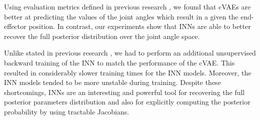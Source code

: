 \documentclass[conference]{IEEEtran}
\begin{document}
Using evaluation metrics defined in previous research \cite{Kruse2019}, we found that cVAEs are better at predicting the values of the joint angles which result in a given the end-effector position. In contrast, our experiments show that INNs are able to better recover the full posterior distribution over the joint angle space. 

Unlike stated in previous research \cite{Ardizzone2018}, we had to perform an additional unsupervised backward training of the INN to match the performance of the cVAE. This resulted in considerably slower training times for the INN models. Moreover, the INN models tended to be more unstable during training. Despite these shortcomings, INNs are an interesting and powerful tool for recovering the full posterior parameters distribution and also for explicitly computing the posterior probability by using tractable Jacobians.

\nocite{*}


\end{document}
